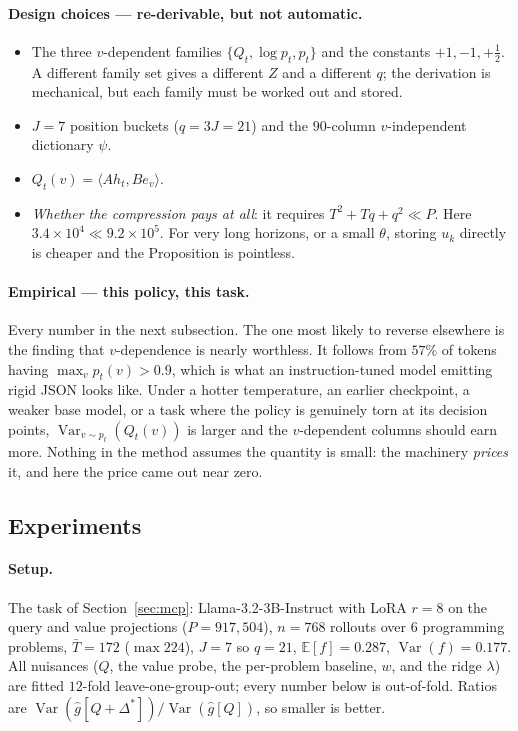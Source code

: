 \documentclass{article}
\theoremstyle{plain}
\theoremstyle{definition}
\newcommand{\E}{\mathbb{E}}
\DeclareMathOperator{\Var}{Var}
\begin{document}
\paragraph{Design choices --- re-derivable, but not automatic.}
\begin{itemize}
\item The three $v$-dependent families $\{Q_t,\log p_t,p_t\}$ and the constants $+1,-1,+\tfrac12$.
A different family set gives a different $Z$ and a different $q$; the derivation is mechanical, but
each family must be worked out and stored.
\item $J=7$ position buckets ($q=3J=21$) and the $90$-column $v$-independent dictionary $\psi$.
\item $Q_t(v)=\langle Ah_t,Be_v\rangle$.
\item \emph{Whether the compression pays at all}: it requires $T^2+Tq+q^2\ll P$. Here
$3.4\times10^4\ll9.2\times10^5$. For very long horizons, or a small $\theta$, storing $u_k$ directly is
cheaper and the Proposition is pointless.
\end{itemize}

\paragraph{Empirical --- this policy, this task.} Every number in the next subsection. The one most
likely to reverse elsewhere is the finding that $v$-dependence is nearly worthless. It follows from
$57\%$ of tokens having $\max_v p_t(v)>0.9$, which is what an instruction-tuned model emitting rigid
JSON looks like. Under a hotter temperature, an earlier checkpoint, a weaker base model, or a task
where the policy is genuinely torn at its decision points, $\Var_{v\sim p_t}(Q_t(v))$ is larger and the
$v$-dependent columns should earn more. Nothing in the method assumes the quantity is small: the
machinery \emph{prices} it, and here the price came out near zero.

\subsection{Experiments}

\paragraph{Setup.} The task of Section~\ref{sec:mcp}: Llama-3.2-3B-Instruct with LoRA $r{=}8$ on the
query and value projections ($P=917{,}504$), $n=768$ rollouts over $6$ programming problems,
$\bar T=172$ ($\max 224$), $J=7$ so $q=21$, $\E[f]=0.287$, $\Var(f)=0.177$. All nuisances ($Q$, the
value probe, the per-problem baseline, $w$, and the ridge $\lambda$) are fitted $12$-fold
leave-one-group-out; every number below is out-of-fold. Ratios are $\Var(\hat g[Q+\Delta^*])/\Var(\hat g[Q])$,
so smaller is better.
\end{document}
